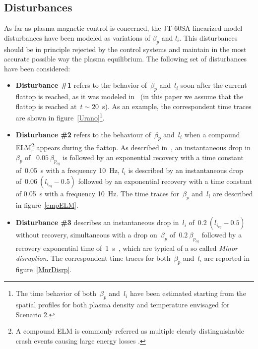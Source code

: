 \subsection{Disturbances}


As far as plasma magnetic control is concerned, the JT-60SA linearized model disturbances have been modeled as variations of $\beta_p$ and $l_i$. This disturbances should be in principle rejected by the control systems and maintain in the most accurate possible way the plasma equilibrium.  The following set of disturbances have been considered: 

\begin{itemize}
	\item \textbf{Disturbance \#1} refers to the behavior of~$\beta_p$ and~$l_i$ soon after the current flattop is reached, as it was modeled in~\cite{urano2015development} (in this paper we assume that the flattop is reached at~$t\sim 20$~s). As an example, the correspondent time traces are shown in figure~\ref{Urano}\footnote{The time behavior of both~$\beta_p$ and~$l_i$ have been estimated starting from the spatial profiles for both plasma density and temperature envisaged for Scenario 2.}.
	
	


	
	\item \textbf{Disturbance \#2} refers to the behaviour of~$\beta_p$ and~$l_i$ when a compound ELM\footnote{A compound ELM is commonly referred as multiple clearly distinguishable
	crash events causing large energy losses \cite{Meyer2017}.} appears during the flattop.  As described in~\cite[p.~34]{JT60SA:PID}, an instantaneous drop   in~$\beta_p$ of ~$0.05~\beta_{p_{eq}}$ is followed by an exponential recovery with a time constant of~0.05~s with a frequency 10~Hz, $l_i$ is described by an instantaneous drop of~$0.06~(l_{i_{eq}}-0.5)$ followed by an exponential recovery with a time constant of 0.05~s with a frequency 10~Hz. The time traces for~$\beta_p$ and~$l_i$ are described in figure~\ref{cmpELM}.
	


	
	\item \textbf{Disturbance \#3} describes an instantaneous drop in~$l_i$ of~$0.2~(l_{i_{eq}}-0.5)$ without recovery, simultaneous with a drop on~$\beta_p$ of~$0.2~\beta_{p_{eq}}$ followed by a recovery exponential time of~1~s~\cite[p.~34]{JT60SA:PID}, which are typical of a so called \emph{Minor disruption}. The correspondent time traces for both~$\beta_p$ and~$l_i$ are reported in figure~\ref{MnrDisrp}.
\end{itemize}


